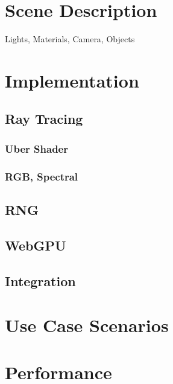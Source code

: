 
\section{Scene Description}
Lights, Materials, Camera, Objects
\section{Implementation}
\subsection{Ray Tracing}
\subsubsection{Uber Shader}
\subsubsection{RGB, Spectral}
\subsection{RNG}
\subsection{WebGPU}
\subsection{Integration}
\section{Use Case Scenarios}
\section{Performance}